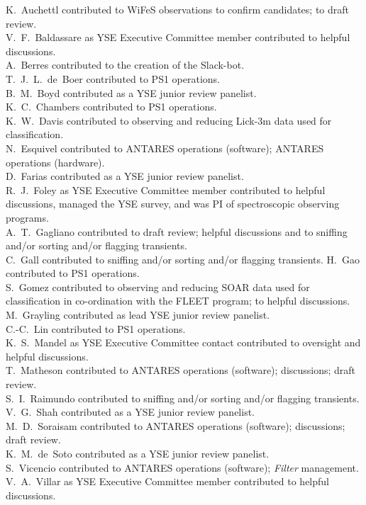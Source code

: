 \documentclass[twocolumn]{aastex63}
\begin{document}
K.~Auchettl contributed to WiFeS observations to confirm candidates; to draft review.\\
V.~F.~Baldassare as YSE Executive Committee member contributed to helpful discussions.\\
A.~Berres contributed to the creation of the Slack-bot.\\
T.~J.~L.~de~Boer contributed to PS1 operations.\\
B.~M.~Boyd contributed as a YSE junior review panelist.\\
K.~C.~Chambers contributed to PS1 operations.\\
K.~W.~Davis contributed to observing and reducing Lick-3m data used for classification.\\ 
N.~Esquivel contributed to ANTARES operations (software); ANTARES operations (hardware).\\
D.~Farias contributed as a YSE junior review panelist.\\
R.~J.~Foley as YSE Executive Committee member contributed to helpful discussions, managed the YSE survey, and was PI of spectroscopic observing programs.\\ 
A.~T.~Gagliano contributed to draft review; helpful discussions and to sniffing and/or sorting and/or flagging transients.\\ 
C.~Gall contributed to sniffing and/or sorting and/or flagging transients.
H.~Gao contributed to PS1 operations.\\
S.~Gomez contributed to observing and reducing SOAR data used for classification in co-ordination with the FLEET program; to helpful discussions.\\
M.~Grayling contributed as lead YSE junior review panelist.\\
C.-C.~Lin contributed to PS1 operations.\\
K.~S.~Mandel as YSE Executive Committee contact contributed to oversight and helpful discussions.\\
T.~Matheson contributed to ANTARES operations (software); discussions; draft review.\\
S.~I.~Raimundo contributed to sniffing and/or sorting and/or flagging transients.\\
V.~G.~Shah contributed as a YSE junior review panelist.\\
M.~D.~Soraisam contributed to ANTARES operations (software); discussions; draft review.\\
K.~M.~de~Soto contributed as a YSE junior review panelist.\\
S.~Vicencio contributed to ANTARES operations (software); \emph{Filter} management.\\
V.~A.~Villar as YSE Executive Committee member contributed to helpful discussions.\\
\end{document}
